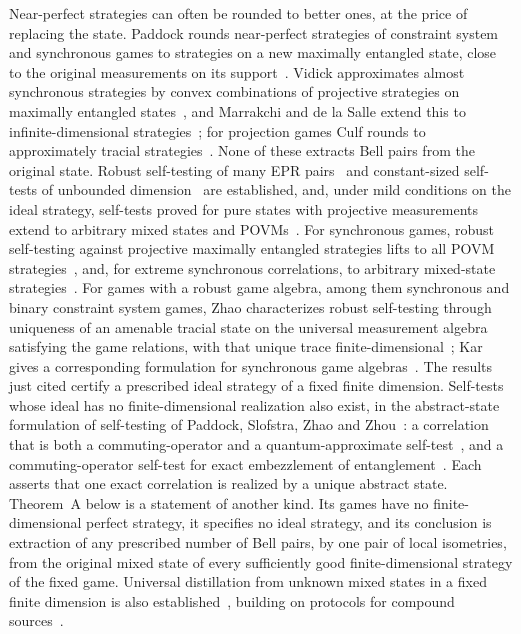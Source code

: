 Near-perfect strategies can often be rounded to better ones, at the price of replacing the state. Paddock rounds near-perfect
strategies of constraint system and synchronous games to strategies on a new maximally entangled state, close to the original
measurements on its support~\cite[Corollaries~4.14 and~4.28]{Pad22}. Vidick approximates almost synchronous strategies by convex
combinations of projective strategies on maximally entangled states~\cite[Theorem~3.1]{Vid22}, and Marrakchi and de la Salle extend
this to infinite-dimensional strategies~\cite{MdlS23}; for projection games Culf rounds to approximately tracial
strategies~\cite{Cul26}. None of these extracts Bell pairs from the original state. Robust self-testing of many EPR
pairs~\cite{NV17,CRSV18,CS18,McK16} and constant-sized self-tests of unbounded dimension~\cite{Fu22,MPS21} are established, and,
under mild conditions on the ideal strategy, self-tests proved for pure states with projective measurements extend to arbitrary
mixed states and POVMs~\cite[Theorem~4.1]{Bap25}. For synchronous games, robust self-testing against projective maximally entangled
strategies lifts to all POVM strategies~\cite[Theorem~1.2]{VZ26}, and, for extreme synchronous correlations, to arbitrary
mixed-state strategies~\cite[Theorem~3.3]{CZ26}. For games with a robust game algebra, among them synchronous and binary constraint
system games, Zhao characterizes robust self-testing through uniqueness of an amenable tracial state on the universal measurement
algebra satisfying the game relations, with that unique trace finite-dimensional~\cite[Theorem~7.10]{Zha24}; Kar gives a
corresponding formulation for synchronous game algebras~\cite[Theorem~5.5]{Kar25}. The results just cited certify a prescribed ideal
strategy of a fixed finite dimension. Self-tests whose ideal has no finite-dimensional realization also exist, in the abstract-state
formulation of self-testing of Paddock, Slofstra, Zhao and Zhou~\cite[Section~7]{PSZZ24}: a correlation that is both a
commuting-operator and a quantum-approximate self-test~\cite[Section~6.1, Proposition~6.2]{CZ26}, and a commuting-operator self-test
for exact embezzlement of entanglement~\cite[Theorem~1.1]{PaSc26}. Each asserts that one exact correlation is realized by a unique
abstract state. Theorem~A below is a statement of another kind. Its games have no finite-dimensional perfect strategy, it specifies
no ideal strategy, and its conclusion is extraction of any prescribed number of Bell pairs, by one pair of local isometries, from
the original mixed state of every sufficiently good finite-dimensional strategy of the fixed game. Universal distillation from
unknown mixed states in a fixed finite dimension is also established~\cite{TWMAH26,TMGL26}, building on protocols for compound
sources~\cite{BJ14}.

